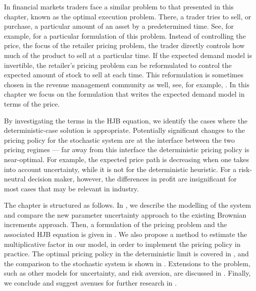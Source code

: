 \documentclass[main.tex]{subfiles}
\begin{document}
In financial markets traders face a similar problem to
that presented in this chapter, known as the optimal execution
problem. There, a trader tries to sell, or purchase,
a particular amount of an asset by a predetermined time. See, for example,
\citet{predoiu2011optimal} for a particular formulation of this problem.
Instead of controlling the price, the focus of the retailer pricing
problem, the trader directly controls how much
of the product to sell at a particular time. If the expected demand
model is invertible, the retailer's pricing problem can be
reformulated to control the expected amount of stock to sell at each
time. This reformulation is sometimes chosen in the revenue management
community as well, see, for example, \citet{bitran2003overview}.
In this chapter we focus on the formulation that writes the expected
demand model in terms of the price.

By investigating the terms in the HJB equation,
we identify the cases where the deterministic-case solution is appropriate.
Potentially significant changes to the
pricing policy for the stochastic system are at the interface between
the two pricing regimes --- far away from this interface the
deterministic pricing policy is near-optimal. For example, the
expected price path is decreasing when one takes into account
uncertainty, while it is not for the deterministic heuristic.
For a risk-neutral decision maker, however, the differences in profit
are insignificant for most cases that may be relevant in industry.


The chapter is structured as follows. In , we
describe the modelling of the system and compare the new parameter uncertainty
approach to the existing Brownian increments approach.
Then, a formulation of the pricing problem and the associated HJB
equation is given in . We also propose
a method to estimate the multiplicative factor in our model, in
order to implement the pricing policy in practice.
The optimal pricing policy in the deterministic limit is covered in
, and the comparison to the stochastic
system is shown in .
Extensions to the problem, such as other models for uncertainty, and
risk aversion, are discussed in .
Finally, we conclude and
suggest avenues for further research in .
\end{document}

